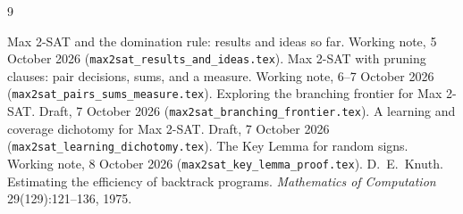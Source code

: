 \documentclass[11pt,a4paper]{article}
\theoremstyle{definition}
\theoremstyle{remark}
\begin{document}
\begin{thebibliography}{9}
\raggedright
{} Max 2-SAT and the domination rule: results and ideas so far.
 Working note, 5 October 2026 (\texttt{max2sat\_results\_and\_ideas.tex}).
 Max 2-SAT with pruning clauses: pair decisions, sums, and a
 measure. Working note, 6--7 October 2026
 (\texttt{max2sat\_pairs\_sums\_measure.tex}).
 Exploring the branching frontier for Max 2-SAT. Draft,
 7 October 2026 (\texttt{max2sat\_branching\_frontier.tex}).
 A learning and coverage dichotomy for Max 2-SAT. Draft,
 7 October 2026 (\texttt{max2sat\_learning\_dichotomy.tex}).
 The Key Lemma for random signs. Working note, 8 October 2026
 (\texttt{max2sat\_key\_lemma\_proof.tex}).
 D.~E.~Knuth. Estimating the efficiency of backtrack
 programs. \emph{Mathematics of Computation} 29(129):121--136, 1975.
\end{thebibliography}
\end{document}

